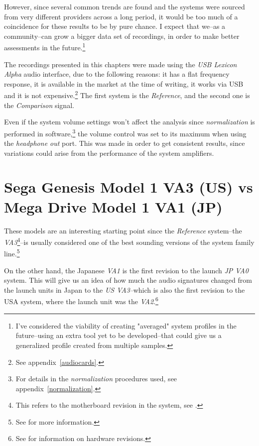 \documentclass[10pt,a4paper]{report}
\begin{document}
However, since several common trends are found and the systems were sourced from very different providers across a long period, it would be too much of a coincidence for these results to be by pure chance. I expect that we--as a community--can grow a bigger data set of recordings, in order to make better assessments in the future.\footnote{I've considered the viability of creating "averaged" system profiles in the future--using an extra tool yet to be developed--that could give us a generalized profile created from multiple samples.}

The recordings presented in this chapters were made using the \textit{USB Lexicon Alpha} audio interface, due to the following reasons: it has a flat frequency response, it is available in the market at the time of writing, it works via USB and it is not expensive.\footnote{See appendix~\ref{audiocards}.} The first system is the \textit{Reference}, and the second one is the \textit{Comparison} signal.

Even if the system volume settings won't affect the analysis since \textit{normalization} is performed in software,\footnote{For details in the \textit{normalization} procedures used, see appendix~\ref{normalization}.} the volume control was set to its maximum when using the \textit{headphone out} port. This was made in order to get consistent results, since variations could arise from the performance of the system amplifiers.

\section{Sega Genesis Model 1 VA3 (US) vs\\ Mega Drive Model 1 VA1 (JP)}

These models are an interesting starting point since the \textit{Reference} system--the \textit{VA3}\footnote{This refers to the motherboard revision in the system, see \cite{genesisaudio}.}--is usually considered one of the best sounding versions of the system family line.\footnote{See \cite{genesisaudio2} for more information.}

On the other hand, the Japanese \textit{VA1} is the first revision to the launch \textit{JP VA0} system. This will give us an idea of how much the audio signatures changed from the launch units in Japan to the \textit{US VA3}--which is also the first revision to the USA system, where the launch unit was the \textit{VA2}.\footnote{See \cite{genesishw} for information on hardware revisions.}
\end{document}
